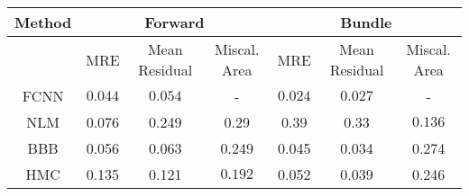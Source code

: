\documentclass[convert={outext=.png}]{standalone}
\begin{document}
\centering
\label{tab:experimental_results}



\begin{tabular}{c c c c c c c}
\hline
\hline
Method &  \multicolumn{3}{c}{Forward} & \multicolumn{3}{c}{Bundle} \\ \hline
 & MRE & Mean Residual & Miscal. Area & MRE & Mean Residual & Miscal. Area\\
 FCNN & $\mathbf{0.044}$ & $\mathbf{0.054}$ & - & $\mathbf{0.024}$ & $\mathbf{0.027}$ & - \\
 \hline
 NLM & 0.076 & 0.249 & 0.29 & 0.39 & 0.33 & $\mathbf{0.136}$ \\
 BBB & 0.056 & 0.063 & 0.249 & 0.045 & 0.034 & 0.274 \\
 HMC & 0.135 & 0.121 & $\mathbf{0.192}$ & 0.052 & 0.039 & 0.246 \\
\hline
\hline
\end{tabular}
\end{document}
